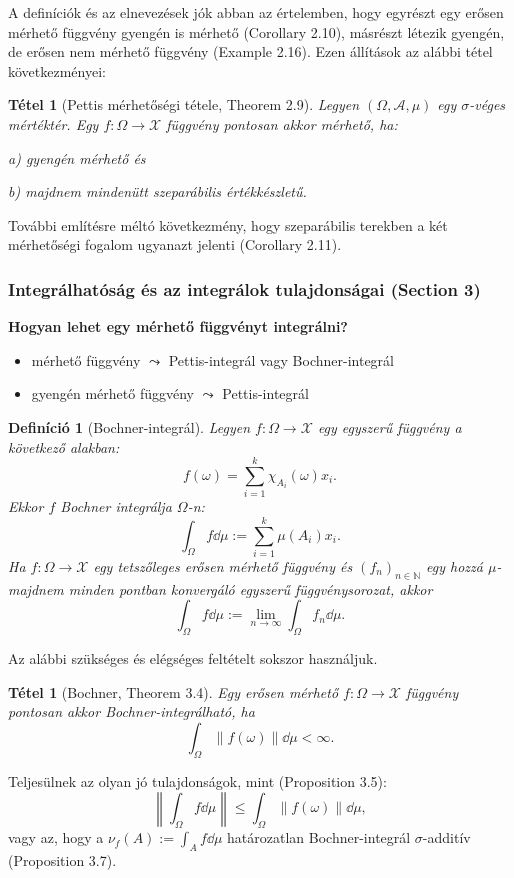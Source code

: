 \documentclass[handout]{beamer} %
\newtheorem{theo}[lem]{Tétel}
\newtheorem{defi}[lem]{Definíció}
\begin{document}
\begin{frame}
\justifying
A definíciók és az elnevezések jók abban az értelemben, hogy egyrészt egy erősen mérhető függvény gyengén is mérhető (Corollary 2.10), másrészt létezik gyengén, de erősen nem mérhető függvény (Example 2.16). Ezen állítások az alábbi tétel következményei:
\begin{theo}[Pettis mérhetőségi tétele, Theorem 2.9] Legyen $(\Omega,\mathcal{A},\mu)$ egy $\sigma$-véges mértéktér. Egy $f \colon \Omega \to \mathcal{X}$ függvény pontosan akkor mérhető, ha:

a) gyengén mérhető és

b) majdnem mindenütt szeparábilis értékkészletű.
\end{theo}
További említésre méltó következmény, hogy szeparábilis terekben a két mérhetőségi fogalom ugyanazt jelenti (Corollary 2.11).
\end{frame}

\begin{frame}
\frametitle{Integrálhatóság és az integrálok tulajdonságai (Section 3)}
\textbf{Hogyan lehet egy mérhető függvényt integrálni?}
\begin{itemize}
\item mérhető függvény $\leadsto$ Pettis-integrál vagy Bochner-integrál
\item gyengén mérhető függvény $\leadsto$ Pettis-integrál
\end{itemize}
\end{frame}

\begin{frame}
\justifying
\begin{defi}[Bochner-integrál] Legyen $f \colon \Omega \to \mathcal{X}$ egy egyszerű függvény a következő alakban:
$$f(\omega) = \sum^{k}_{i=1} \chi_{A_i}(\omega) x_i.$$ Ekkor $f$ Bochner integrálja $\Omega$-n:
$$\int_{\Omega} f \dd{\mu} := \sum^{k}_{i=1} \mu(A_i) x_i.$$
Ha $f \colon \Omega \to \mathcal{X}$ egy tetszőleges erősen mérhető függvény és $(f_n)_{n \in \mathbb{N}}$ egy hozzá $\mu$-majdnem minden pontban konvergáló egyszerű függvénysorozat, akkor
$$\int_{\Omega} f \dd{\mu} := \lim_{n \to \infty} \int_{\Omega} f_n \dd{\mu}.$$
\end{defi}
\end{frame}

\begin{frame}
\justifying
Az alábbi szükséges és elégséges feltételt sokszor használjuk.
\begin{theo}[Bochner, Theorem 3.4] Egy erősen mérhető $f \colon \Omega \to \mathcal{X}$ függvény pontosan akkor Bochner-integrálható, ha
$$\int_{\Omega} \| f(\omega) \| \dd{\mu} < \infty.$$
\end{theo}
Teljesülnek az olyan jó tulajdonságok, mint (Proposition 3.5):
$$\left \| \int_{\Omega} f \dd{\mu} \right\| \leqslant \int_{\Omega} \| f(\omega) \| \dd{\mu},$$
vagy az, hogy a $\nu_f(A) := \int_{A} f \dd{\mu}$ határozatlan Bochner-integrál $\sigma$-additív (Proposition 3.7).
\end{frame}
\end{document}
